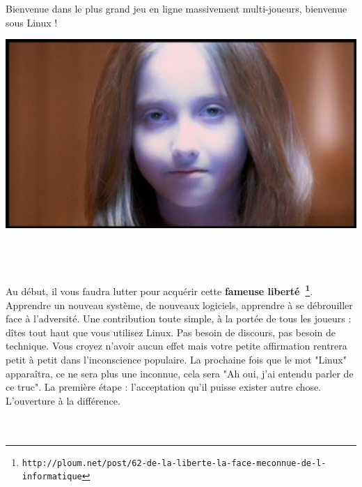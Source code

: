 \documentclass[11pt,twoside,a4paper]{article}
\begin{document}
\begin{minipage}[ht]{0.30\textwidth}
	Bienvenue dans le plus grand jeu en ligne massivement multi-joueurs, bienvenue sous Linux !
\end{minipage} \hfill \begin{minipage}[ht]{14.10cm}
	\includegraphics[width=14.05cm]{img/avalon27.jpg}
\end{minipage}~\\~\\~\\

Au d{\'e}but, il vous faudra lutter pour acqu{\'e}rir cette \textbf{fameuse libert{\'e}~\footnote{\texttt{http://ploum.net/post/62-de-la-liberte-la-face-meconnue-de-l-informatique}}}. Apprendre un nouveau syst{\`e}me, de nouveaux logiciels, apprendre {\`a} se d{\'e}brouiller face {\`a} l'adversit{\'e}. Une contribution toute simple, {\`a} la port{\'e}e de tous les joueurs : d{\^i}tes tout haut que vous utilisez Linux. Pas besoin de discours, pas besoin de technique. Vous croyez n'avoir aucun effet mais votre petite affirmation rentrera petit {\`a} petit dans l'inconscience populaire. La prochaine fois que le mot "Linux" appara{\^i}tra, ce ne sera plus une inconnue, cela sera "Ah oui, j'ai entendu parler de ce truc". La premi{\`e}re {\'e}tape : l'acceptation qu'il puisse exister autre chose. L'ouverture {\`a} la diff{\'e}rence. ~\\~\\~\\
\end{document}
